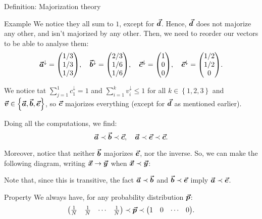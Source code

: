 \documentclass[a4paper]{article}
\begin{document}
\begin{parag}{Definition: Majorization theory}
\begin{subparag}{Example}
        We notice they all sum to $1$, except for $\bm{\protect\vec{d}}$. Hence, $\bm{\protect\vec{d}}$ does not majorize any other, and isn't majorized by any other. Then, we need to reorder our vectors to be able to analyse them: 
        \[\bvec{a}^{\downarrow} = \begin{pmatrix} 1/3 \\ 1/3 \\ 1/3 \end{pmatrix}, \mathspace \bvec{b}^{\downarrow} = \begin{pmatrix} 2/3 \\ 1/6 \\ 1/6 \end{pmatrix}, \mathspace \bvec{c}^{\downarrow} = \begin{pmatrix} 1 \\ 0 \\ 0 \end{pmatrix}, \mathspace \bvec{e}^{\downarrow} = \begin{pmatrix} 1/2 \\ 1/2 \\ 0 \end{pmatrix}.\]
        
        We notice tat $\sum_{j=1}^{1} c_1^{\downarrow} = 1$ and $\sum_{i=1}^{k} v_i^{\downarrow} \leq 1$ for all $k \in \left\{1, 2, 3\right\}$ and $\bvec{v} \in \left\{\bvec{a}, \bvec{b}, \bvec{e}\right\}$, so $\bm{\protect\vec{c}}$ majorizes everything (except for $\bm{\protect\vec{d}}$ as mentioned earlier).

        Doing all the computations, we find: 
        \[\bm{\protect\vec{a}} \prec \bm{\protect\vec{b}} \prec \bm{\protect\vec{c}}, \quad \bm{\protect\vec{a}} \prec \bm{\protect\vec{e}} \prec \bm{\protect\vec{c}}.\]

        Moreover, notice that neither $\bm{\protect\vec{b}}$ majorizes $\bm{\protect\vec{e}}$, nor the inverse. So, we can make the following diagram, writing $\bm{\protect\vec{x}} \to \bm{\protect\vec{y}}$ when $\bm{\protect\vec{x}} \prec \bm{\protect\vec{y}}$:

        Note that, since this is transitive, the fact $\bm{\protect\vec{a}} \prec \bm{\protect\vec{b}}$ and $\bm{\protect\vec{b}} \prec \bm{\protect\vec{e}}$ imply $\bm{\protect\vec{a}} \prec \bm{\protect\vec{e}}$.
    \end{subparag}

    \begin{subparag}{Property}
        We always have, for any probability distribution $\bm{\protect\vec{p}}$: 
        \[\begin{pmatrix} \frac{1}{N} & \frac{1}{N} & \cdots & \frac{1}{N} \end{pmatrix} \prec \bvec{p} \prec \begin{pmatrix} 1 & 0 & \cdots & 0 \end{pmatrix}.\]
    \end{subparag}
\end{parag}
\end{document}
